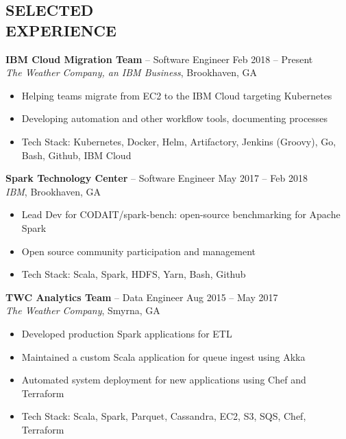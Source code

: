 \documentclass[margin]{res}
\begin{document}
\begin{resume}
\section{SELECTED \\ EXPERIENCE}
                \textbf{IBM Cloud Migration Team} -- Software Engineer \hfill Feb 2018 -- Present \\
                \textit{The Weather Company, an IBM Business}, Brookhaven, GA
                \begin{itemize}  \itemsep -2pt %
                  \item Helping teams migrate from EC2 to the IBM Cloud targeting Kubernetes
                  \item Developing automation and other workflow tools, documenting processes
                  \item Tech Stack: Kubernetes, Docker, Helm, Artifactory, Jenkins (Groovy), Go, Bash, Github, IBM Cloud
                \end{itemize}

                \textbf{Spark Technology Center} -- Software Engineer \hfill May 2017 -- Feb 2018 \\
                \textit{IBM}, Brookhaven, GA
                \begin{itemize}  \itemsep -2pt %
                  \item Lead Dev for CODAIT/spark-bench: open-source benchmarking for Apache Spark
                  \item Open source community participation and management
                  \item Tech Stack: Scala, Spark, HDFS, Yarn, Bash, Github
                \end{itemize}

                \textbf{TWC Analytics Team} -- Data Engineer \hfill Aug 2015 -- May 2017 \\
                \textit{The Weather Company}, Smyrna, GA
                \begin{itemize}  \itemsep -2pt %
                  \item Developed production Spark applications for ETL
                  \item Maintained a custom Scala application for queue ingest using Akka
                  \item Automated system deployment for new applications using Chef and Terraform
                  \item Tech Stack: Scala, Spark, Parquet, Cassandra, EC2, S3, SQS, Chef, Terraform
                \end{itemize}


\end{resume}
\end{document}
